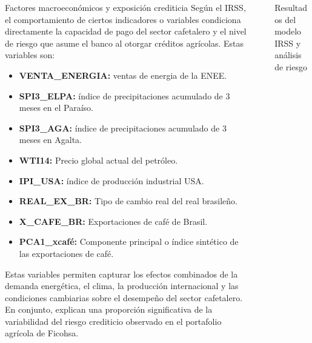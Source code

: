 \documentclass[final]{beamer}
\newlength{\sepwidth}
\newlength{\colwidth}
\newcommand{\separatorcolumn}{\begin{column}{\sepwidth}\end{column}}
\begin{document}
\begin{frame}[t]
\begin{columns}[t]
\begin{column}{\colwidth}
\begin{block}{Factores macroeconómicos y exposición crediticia}
{Según el IRSS, el comportamiento de ciertos indicadores o variables condiciona directamente la capacidad de pago del sector cafetalero y el nivel de riesgo que asume el banco al otorgar créditos agrícolas. Estas variables son: }
{\small
\begin{itemize}
\item \textbf{VENTA\_ENERGIA:} ventas de energia de la ENEE.
\item \textbf{SPI3\_ELPA:} índice de precipitaciones acumulado de 3 meses en el Paraíso.
\item \textbf{SPI3\_AGA:} índice de precipitaciones acumulado de 3 meses en Agalta.
\item \textbf{WTI14:} Precio global actual del petróleo.
\item \textbf{IPI\_USA:} índice de producción industrial USA.
\item \textbf{REAL\_EX\_BR:} Tipo de cambio real del real brasileño.
\item \textbf{X\_CAFE\_BR:} Exportaciones de café de Brasil.
\item \textbf{PCA1\_xcafé:} Componente principal o índice sintético de las exportaciones de café.
\end{itemize}
}
{ Estas variables permiten capturar los efectos combinados de la demanda energética, el clima, la producción internacional y las condiciones cambiarias sobre el desempeño del sector cafetalero. En conjunto, explican una proporción significativa de la variabilidad del riesgo crediticio observado en el portafolio agrícola de Ficohsa.}
  \end{block}

\end{column}

\separatorcolumn

\begin{column}{\colwidth}
  \begin{block}{Resultados del modelo IRSS y análisis de riesgo}
   

\end{block}
\end{column}
\end{columns}
\end{frame}
\end{document}
